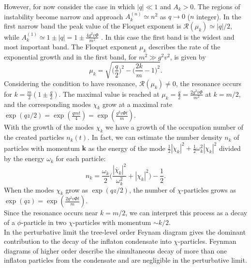 \documentclass[11pt,a4paper,twoside]{book}
\begin{document}
However, for now consider the case in which $ |q|\ll 1 $ and $ A_{k}> 0$. The regions of instability become narrow and approach $ A_{k}^{(n)}\simeq n^{2} $ as $ q\rightarrow 0 $ ($ n  $ integer). In the first narrow band the peak value of the Floquet exponent is $ \mathcal{R}(\mu_{k}) \simeq |q|/2 $, while $ A_{k}^{(1)} \simeq 1 \pm |q| = 1 \pm \frac{4g^{2}v\Phi}{m^{2}} $ \cite{Chap4:Mechanics}. In this case  the first band is the widest and most important band. The Floquet exponent $\mu_{k}$ describes the rate of the exponential growth and in the first band, for $ m^{2} \gg g^{2}v^{2} $, is given by \cite{Chap4:LindePreheatingModel}
\begin{equation}
	\label{Chap4:FloquetExponent}
	\mu_{k}=\sqrt{\Bigg(\frac{q}{2}\Bigg)^{2} - \Bigg(\frac{2k}{m}-1\Bigg)^{2}}.
\end{equation}
Considering the condition to have resonance, $\mathcal{R}(\mu_{k}) \neq 0$, the resonance occurs for $ k=\frac{m}{2}(1 \pm \frac{q}{2}) $. The maximal value is reached at $\mu_{k}=\frac{q}{2}=\frac{2g^{2}v\Phi}{m^{2}}$ at $ k=m/2 $, and the corresponding modes $ \chi_{k} $ grow at a maximal rate $ \exp(qz/2)=\exp(\frac{qmt}{4})=\exp(\frac{g^{2}v\Phi t}{m}) $. \\
With the growth of the modes $ \chi_{k} $ we have a growth of the occupation number of the created particles $ n_{k}(t) $. In fact, we can estimate the number density $ n_{k} $ of particles with momentum $ \textbf{k} $ as the energy of the mode $ \frac{1}{2}|\dot{\chi}_{k}|^{2} + \frac{1}{2}\omega_{k}^{2}|\chi_{k}|^{2} $ divided by the energy $ \omega_{k} $ for each particle:
\begin{equation}
n_{k}=\frac{\omega_{k}}{2}\Bigg(\frac{|\dot{\chi_{k}}|^{2}}{\omega_{k}^{2}} + |\chi_{k}|^{2}\Bigg) - \frac{1}{2}.
\end{equation}
When the modes $ \chi_{k} $ grow as  $\exp(qz/2) $, the number of $ \chi $-particles grows as $ \exp(qz)= \exp(\frac{2g^{2}v\Phi t}{m}) $.\\
Since the resonance occurs near $ k=m/2 $, we can interpret this process as a decay of a $ \phi $-particle in two $ \chi $-particles with momentum $\sim k/2$.\\
In the perturbative limit the tree-level order Feynam diagram gives the dominant contribution to the decay of the inflaton condensate into $ \chi $-particles. Feynman diagrams of higher order describe the simultaneous decay of more than one inflaton particles from the condensate and are negligible in the perturbative limit.
\end{document}
